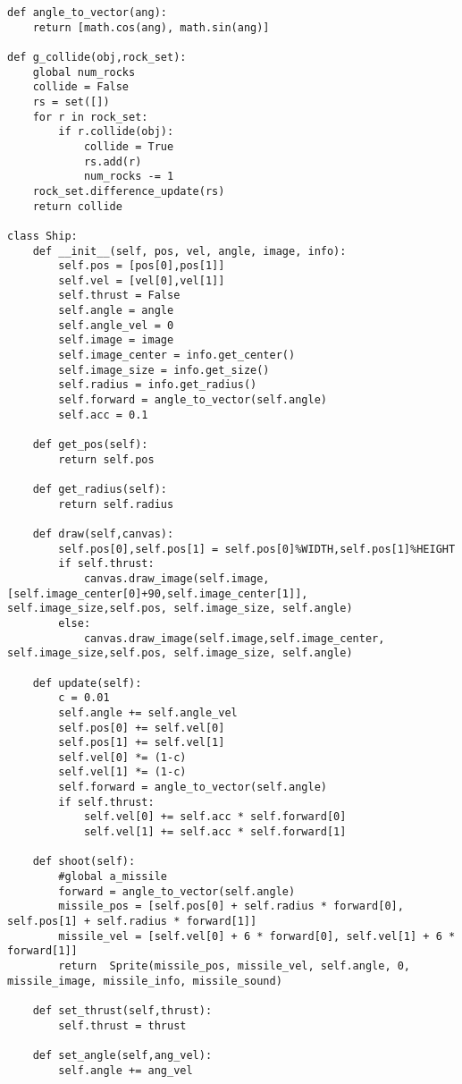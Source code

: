 \documentclass[9pt]{amsart}
\begin{document}
\begin{multicols}{2}
\begin{lstlisting}
def angle_to_vector(ang):
    return [math.cos(ang), math.sin(ang)]

def g_collide(obj,rock_set):
    global num_rocks
    collide = False
    rs = set([])
    for r in rock_set:
        if r.collide(obj):
            collide = True
            rs.add(r)
            num_rocks -= 1
    rock_set.difference_update(rs)
    return collide 
 
class Ship:
    def __init__(self, pos, vel, angle, image, info):
        self.pos = [pos[0],pos[1]]
        self.vel = [vel[0],vel[1]]
        self.thrust = False
        self.angle = angle
        self.angle_vel = 0
        self.image = image
        self.image_center = info.get_center()
        self.image_size = info.get_size()
        self.radius = info.get_radius()
        self.forward = angle_to_vector(self.angle)
        self.acc = 0.1
        
    def get_pos(self):
        return self.pos
    
    def get_radius(self):
        return self.radius

    def draw(self,canvas):
        self.pos[0],self.pos[1] = self.pos[0]%WIDTH,self.pos[1]%HEIGHT
        if self.thrust:
            canvas.draw_image(self.image,[self.image_center[0]+90,self.image_center[1]], self.image_size,self.pos, self.image_size, self.angle)
        else:
            canvas.draw_image(self.image,self.image_center, self.image_size,self.pos, self.image_size, self.angle)

    def update(self):
        c = 0.01
        self.angle += self.angle_vel
        self.pos[0] += self.vel[0]
        self.pos[1] += self.vel[1]
        self.vel[0] *= (1-c)
        self.vel[1] *= (1-c)
        self.forward = angle_to_vector(self.angle)
        if self.thrust:
            self.vel[0] += self.acc * self.forward[0]
            self.vel[1] += self.acc * self.forward[1]

    def shoot(self):
        #global a_missile
        forward = angle_to_vector(self.angle)
        missile_pos = [self.pos[0] + self.radius * forward[0], self.pos[1] + self.radius * forward[1]]
        missile_vel = [self.vel[0] + 6 * forward[0], self.vel[1] + 6 * forward[1]]
        return  Sprite(missile_pos, missile_vel, self.angle, 0, missile_image, missile_info, missile_sound)
    
    def set_thrust(self,thrust):
        self.thrust = thrust
    
    def set_angle(self,ang_vel):
        self.angle += ang_vel
    

\end{lstlisting}
\end{multicols}
\end{document}
